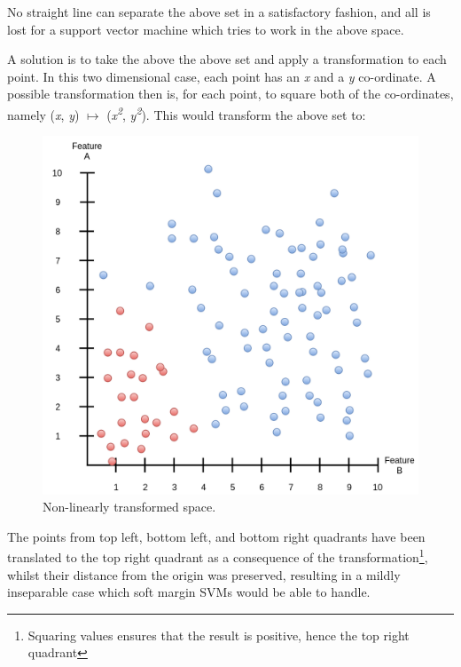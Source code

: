 \documentclass[a4paper, 12pt]{article}
\begin{document}
                        \par No straight line can separate the above set in a satisfactory fashion, and all is lost for a support vector machine which tries to work in the above space. 
                        
                        \par A solution is to take the above the above set and apply a transformation to each point. In this two dimensional case, each point has an \textit{x} and a \textit{y} co-ordinate. A possible transformation then is, for each point, to square both of the co-ordinates, namely (\textit{x}, \textit{y}) \(\mapsto\) (\textit{x\textsuperscript{2}}, \textit{y\textsuperscript{2}}). This would transform the above set to:
                        
                        \begin{figure}[h]
                            \caption{Non-linearly transformed space.}
                            \centering
                            \includegraphics[width=\textwidth]{postTransformationSpace}
                        \end{figure} 
                        
                        \par The points from top left, bottom left, and bottom right quadrants have been translated to the top right quadrant as a consequence of the transformation\footnote{Squaring values ensures that the result is positive, hence the top right quadrant}, whilst their distance from the origin was preserved, resulting in a mildly inseparable case which soft margin SVMs would be able to handle.
                        
\end{document}
